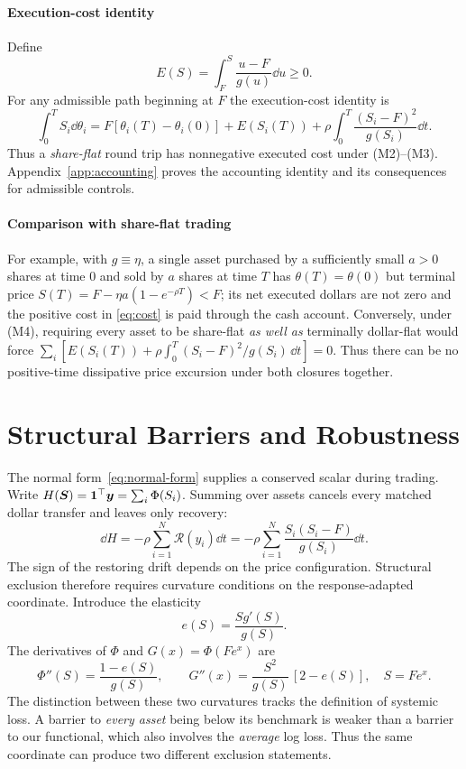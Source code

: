 \documentclass[review,hidelinks,onefignum,onetabnum]{siamonline250211}
\begin{document}
\paragraph{Execution-cost identity} Define
\begin{equation}\label{eq:E}
E(S)=\int_F^S\frac{u-F}{g(u)}\dd u\ge0.
\end{equation}
For any admissible path beginning at $F$ the execution-cost identity is
\begin{equation}\label{eq:cost}
\int_0^T S_i\dd\theta_i=F[\theta_i(T)-\theta_i(0)]+E(S_i(T))
+\rho\int_0^T\frac{(S_i-F)^2}{g(S_i)}\dd t.
\end{equation}
Thus a \emph{share-flat} round trip has nonnegative executed cost under (M2)--(M3). Appendix~\ref{app:accounting} proves the accounting identity and its consequences for admissible controls.

\paragraph{Comparison with share-flat trading}
For example, with $g\equiv\eta$, a single asset purchased by a sufficiently small $a>0$ shares at time $0$ and sold by $a$ shares at time $T$ has $\theta(T)=\theta(0)$ but terminal price $S(T)=F-\eta a(1-e^{-\rho T})<F$; its net executed dollars are not zero and the positive cost in \eqref{eq:cost} is paid through the cash account. Conversely, under (M4), requiring every asset to be share-flat \emph{as well as} terminally dollar-flat would force $\sum_i[E(S_i(T))+\rho\int_0^T(S_i-F)^2/g(S_i)\,\dd t]=0$. Thus there can be no positive-time dissipative price excursion under both closures together.

\section{Structural Barriers and Robustness}\label{sec:barriers}
The normal form~\eqref{eq:normal-form} supplies a conserved scalar during trading. Write $H(\bm S)=\mathbf{1}^\top\bm y=\sum_i\Phi(S_i)$. Summing over assets cancels every matched dollar transfer and leaves only recovery:
\begin{equation}\label{eq:potential-law}
\dd H=-\rho\sum_{i=1}^N\mathcal R(y_i)\dd t
=-\rho\sum_{i=1}^N\frac{S_i(S_i-F)}{g(S_i)}\dd t.
\end{equation}
The sign of the restoring drift depends on the price configuration.
Structural exclusion therefore requires curvature conditions on the
response-adapted coordinate. Introduce the elasticity
\begin{equation}\label{eq:elasticity}
e(S)=\frac{Sg'(S)}{g(S)}.
\end{equation}
The derivatives of $\Phi$ and $G(x)=\Phi(Fe^x)$ are
\begin{equation}\label{eq:curvature}
\Phi''(S)=\frac{1-e(S)}{g(S)},\qquad
G''(x)=\frac{S^2}{g(S)}\,[2-e(S)],\quad S=Fe^x.
\end{equation}
The distinction between these two curvatures tracks the definition of systemic loss. A barrier to \emph{every asset} being below its benchmark is weaker than a barrier to our functional, which also involves the \emph{average} log loss. Thus the same coordinate can produce two different exclusion statements.
\end{document}
